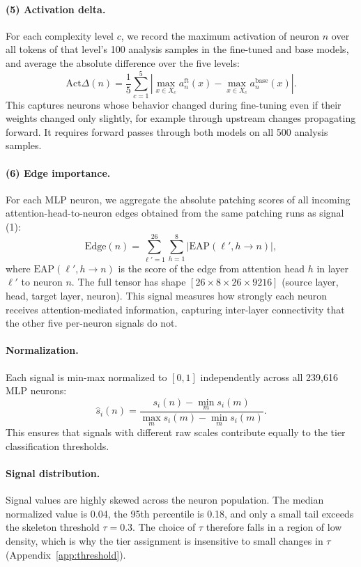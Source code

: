 \documentclass[11pt]{article}
\begin{document}
\paragraph{(5) Activation delta.}
For each complexity level $c$, we record the maximum 
activation of neuron $n$ over all tokens of that level's 100 
analysis samples in the fine-tuned and base models, and average 
the absolute difference over the five levels:
\[
\text{Act}\Delta(n) = \frac{1}{5} \sum_{c=1}^{5} \left| \max_{x \in X_c} a_n^{\text{ft}}(x) - \max_{x \in X_c} a_n^{\text{base}}(x) \right|.
\]
This captures neurons whose behavior changed during 
fine-tuning even if their weights changed only slightly, for 
example through upstream changes propagating forward. It 
requires forward passes through both models on all 500 
analysis samples.

\paragraph{(6) Edge importance.}
For each MLP neuron, we aggregate the absolute patching scores 
of all incoming attention-head-to-neuron edges obtained from 
the same patching runs as signal (1):
\[
\text{Edge}(n) = \sum_{\ell'=1}^{26} \sum_{h=1}^{8} \left| \text{EAP}(\ell', h \to n) \right|,
\]
where $\text{EAP}(\ell', h \to n)$ is the score of the edge from 
attention head $h$ in layer $\ell'$ to neuron $n$. The full 
tensor has shape $[26 \times 8 \times 26 \times 9216]$ (source 
layer, head, target layer, neuron). This signal measures how 
strongly each neuron receives attention-mediated information, 
capturing inter-layer connectivity that the other five 
per-neuron signals do not.

\paragraph{Normalization.}
Each signal is min-max normalized to $[0, 1]$ independently 
across all 239,616 MLP neurons:
\[
\hat{s}_i(n) = \frac{s_i(n) - \min_m s_i(m)}{\max_m s_i(m) - \min_m s_i(m)}.
\]
This ensures that signals with different raw scales contribute 
equally to the tier classification thresholds.

\paragraph{Signal distribution.}
Signal values are highly skewed across the neuron population. 
The median normalized value is 0.04, the 95th percentile is 
0.18, and only a small tail exceeds the skeleton threshold 
$\tau{=}0.3$. The choice of $\tau$ therefore falls in a region 
of low density, which is why the tier assignment is insensitive 
to small changes in $\tau$ (Appendix~\ref{app:threshold}).
\end{document}
